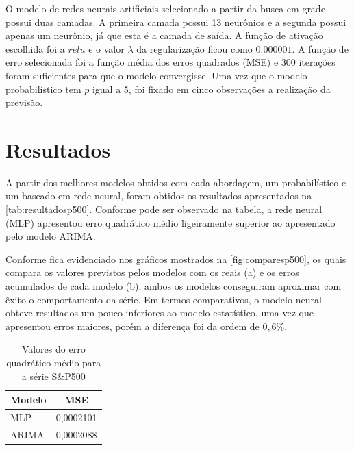 \documentclass[
    12pt,
    oneside,
    a4paper,
    english,
    brazil
]{abntex2}
\begin{document}
O modelo de redes neurais artificiais selecionado a partir da  busca em grade
possui duas  camadas. A  primeira camada  possui 13  neurônios e  a segunda  possui apenas um neurônio, já que esta é a  camada de saída. A função de ativação escolhida foi a $relu$  e o valor $\lambda$ da  regularização ficou como $0.000001$. A  função de erro selecionada foi a função média dos erros quadrados (MSE) e 300 iterações foram suficientes para que o modelo convergisse. 
Uma vez que  o modelo probabilístico tem  $p$ igual a 5,  foi fixado em cinco observações a realização da previsão.

\chapter{Resultados}\label{chap:result}

A  partir dos melhores modelos obtidos com cada abordagem, um probabilístico e um baseado em rede neural, foram  obtidos  os  resultados  apresentados
na   \autoref{tab:resultadosp500}. Conforme pode ser observado na tabela, a rede neural (MLP) apresentou erro quadrático médio ligeiramente superior ao apresentado pelo modelo ARIMA.

Conforme fica evidenciado nos gráficos mostrados na \autoref{fig:comparesp500}, os quais compara os valores previstos pelos modelos com os reais (a) e os erros acumulados de cada modelo (b), ambos os modelos conseguiram aproximar com êxito o comportamento da série. Em termos comparativos, o modelo  neural obteve resultados  um pouco inferiores ao modelo estatístico, uma vez que apresentou erros maiores, porém a diferença foi da ordem de $0,6\%$.

\begin{table}[ht]
    \centering
    \caption{Valores do erro quadrático médio para a série S\&P500}\label{tab:resultadosp500}
    \begin{tabular}{ll}
        \multicolumn{1}{c}{Modelo} & \multicolumn{1}{c}{MSE} \\
        \toprule
        MLP                        & 0,0002101               \\
        ARIMA                      & 0,0002088
    \end{tabular}
\end{table}
\end{document}

